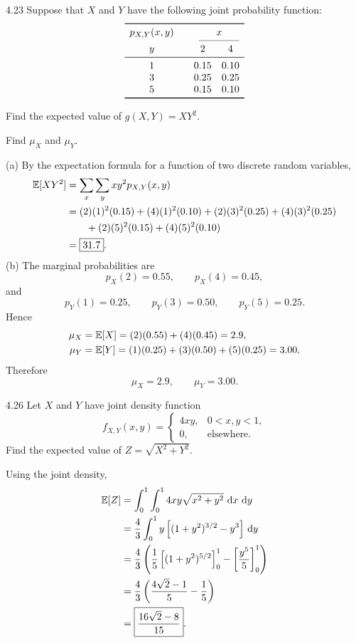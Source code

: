 \documentclass[11pt,oneside]{article}
\begin{document}
\begin{exercise}{4.23}
Suppose that $X$ and $Y$ have the following joint probability function:
\[
\begin{array}{c@{\qquad}cc}
\toprule
p_{X,Y}(x,y) & \multicolumn{2}{c}{x} \\
\cmidrule(lr){2-3}
y & 2 & 4 \\
\midrule
1 & 0.15 & 0.10 \\
3 & 0.25 & 0.25 \\
5 & 0.15 & 0.10 \\
\bottomrule
\end{array}
\]
\begin{exercisesubparts}
    \item Find the expected value of $g(X,Y)=XY^2$.
    \item Find $\mu_X$ and $\mu_Y$.
\end{exercisesubparts}
\end{exercise}
\begin{solution}
\noindent\textup{(a)} By the expectation formula for a function of two discrete random variables,
\[
\begin{aligned}
    \mathbb{E}[XY^2]&=\sum_x\sum_y xy^2p_{X,Y}(x,y)\\
    &=(2)(1)^2(0.15)+(4)(1)^2(0.10)+(2)(3)^2(0.25)+(4)(3)^2(0.25)\\
    &\qquad+(2)(5)^2(0.15)+(4)(5)^2(0.10)\\
    &=\boxed{31.7}.
\end{aligned}
\]
\medskip
\noindent\textup{(b)} The marginal probabilities are
\[p_X(2)=0.55,\qquad p_X(4)=0.45,\]
and
\[p_Y(1)=0.25,\qquad p_Y(3)=0.50,\qquad p_Y(5)=0.25.\]
Hence
\[
\begin{aligned}
    \mu_X&=\mathbb{E}[X]=(2)(0.55)+(4)(0.45)=2.9,\\
    \mu_Y&=\mathbb{E}[Y]=(1)(0.25)+(3)(0.50)+(5)(0.25)=3.00.
\end{aligned}
\]
Therefore
\[\boxed{\mu_X=2.9,\qquad\mu_Y=3.00}.\]
\end{solution}

\begin{exercise}{4.26}
Let $X$ and $Y$ have joint density function
\[
    f_{X,Y}(x,y)=\begin{cases}4xy,&0<x,y<1,\\0,&\text{elsewhere}.\end{cases}
\]
Find the expected value of $Z=\sqrt{X^2+Y^2}$.
\end{exercise}
\begin{solution}
Using the joint density,
\[
\begin{aligned}
    \mathbb{E}[Z]&=\int_0^1\int_0^1 4xy\sqrt{x^2+y^2}\,\mathop{}\!\mathrm{d} x\,\mathop{}\!\mathrm{d} y\\
    &=\frac43\int_0^1 y\left[(1+y^2)^{3/2}-y^3\right] \,\mathop{}\!\mathrm{d} y\\
    &=\frac43\left(\frac15\left[(1+y^2)^{5/2}\right]_0^1-\left[\frac{y^5}{5}\right]_0^1\right)\\
    &=\frac43\left(\frac{4\sqrt2-1}{5}-\frac15\right)\\
    &=\boxed{\frac{16\sqrt2-8}{15}}.
\end{aligned}
\]
\end{solution}
\end{document}

